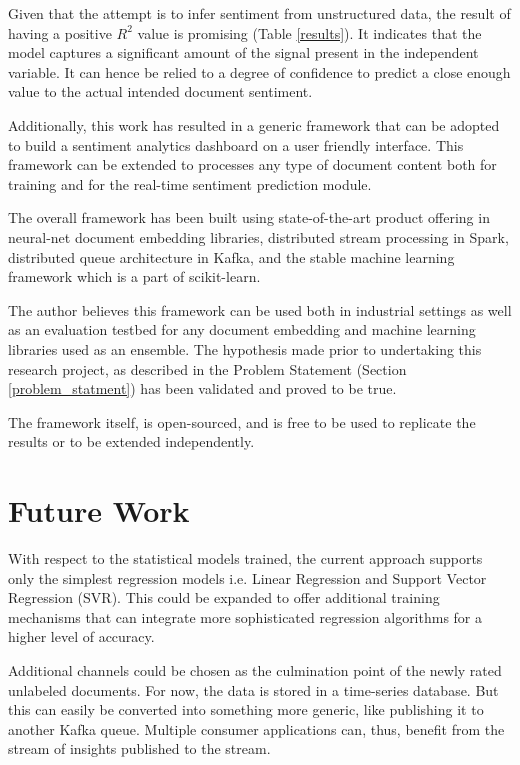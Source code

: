 \documentclass[conference]{IEEEtran}
\begin{document}
    Given that the attempt is to infer sentiment from unstructured data, the result of having a positive $R^2$ value is promising (Table \ref{results}).
    It indicates that the model captures a significant amount of the signal present in the independent variable.
    It can hence be relied to a degree of confidence to predict a close enough value to the actual intended document sentiment.

    Additionally, this work has resulted in a generic framework that can be adopted to build a sentiment analytics dashboard on a user friendly interface. 
    This framework can be extended to processes any type of document content both for training and for the real-time sentiment prediction module.

    The overall framework has been built using state-of-the-art product offering in neural-net document embedding libraries, distributed stream processing in Spark, distributed queue architecture in Kafka, and the stable machine learning framework which is a part of scikit-learn. 

    The author believes this framework can be used both in industrial settings as well as an evaluation testbed for any document embedding and machine learning libraries used as an ensemble. The hypothesis made prior to undertaking this research project, as described in the Problem Statement (Section \ref{problem_statment}) has been validated and proved to be true.

    The framework itself, is open-sourced, and is free to be used to replicate the results or to be extended independently\cite{rapid_rate}.

\vspace{5mm}

\section{Future Work} \label{future_work}
    With respect to the statistical models trained, the current approach supports only the simplest regression models i.e. Linear Regression and Support Vector Regression (SVR). 
    This could be expanded to offer additional training mechanisms that can integrate more sophisticated regression algorithms for a higher level of accuracy.
     
    Additional channels could be chosen as the culmination point of the newly rated unlabeled documents.
    For now, the data is stored in a time-series database.
    But this can easily be converted into something more generic, like publishing it to another Kafka queue.
    Multiple consumer applications can, thus, benefit from the stream of insights published to the stream.
\end{document}
